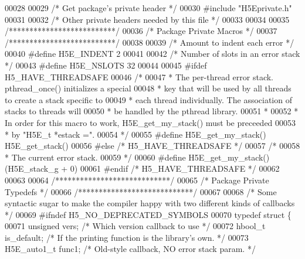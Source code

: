 \begin{DoxyCode}
00028 
00029 \textcolor{comment}{/* Get package's private header */}
00030 \textcolor{preprocessor}{#include "H5Eprivate.h"}
00031 
00032 \textcolor{comment}{/* Other private headers needed by this file */}
00033 
00034 
00035 \textcolor{comment}{/**************************/}
00036 \textcolor{comment}{/* Package Private Macros */}
00037 \textcolor{comment}{/**************************/}
00038 
00039 \textcolor{comment}{/* Amount to indent each error */}
00040 \textcolor{preprocessor}{#define H5E\_INDENT              2}
00041 
00042 \textcolor{comment}{/* Number of slots in an error stack */}
00043 \textcolor{preprocessor}{#define H5E\_NSLOTS          32}
00044 
00045 \textcolor{preprocessor}{#ifdef H5\_HAVE\_THREADSAFE}
00046 \textcolor{comment}{/*}
00047 \textcolor{comment}{ * The per-thread error stack. pthread\_once() initializes a special}
00048 \textcolor{comment}{ * key that will be used by all threads to create a stack specific to}
00049 \textcolor{comment}{ * each thread individually. The association of stacks to threads will}
00050 \textcolor{comment}{ * be handled by the pthread library.}
00051 \textcolor{comment}{ *}
00052 \textcolor{comment}{ * In order for this macro to work, H5E\_get\_my\_stack() must be preceeded}
00053 \textcolor{comment}{ * by "H5E\_t *estack =".}
00054 \textcolor{comment}{ */}
00055 \textcolor{preprocessor}{#define H5E\_get\_my\_stack()  H5E\_get\_stack()}
00056 \textcolor{preprocessor}{#else }\textcolor{comment}{/* H5\_HAVE\_THREADSAFE */}\textcolor{preprocessor}{}
00057 \textcolor{comment}{/*}
00058 \textcolor{comment}{ * The current error stack.}
00059 \textcolor{comment}{ */}
00060 \textcolor{preprocessor}{#define H5E\_get\_my\_stack() (H5E\_stack\_g + 0)}
00061 \textcolor{preprocessor}{#endif }\textcolor{comment}{/* H5\_HAVE\_THREADSAFE */}\textcolor{preprocessor}{}
00062 
00063 
00064 \textcolor{comment}{/****************************/}
00065 \textcolor{comment}{/* Package Private Typedefs */}
00066 \textcolor{comment}{/****************************/}
00067 
00068 \textcolor{comment}{/* Some syntactic sugar to make the compiler happy with two different kinds of callbacks */}
00069 \textcolor{preprocessor}{#ifndef H5\_NO\_DEPRECATED\_SYMBOLS}
00070 \textcolor{keyword}{typedef} \textcolor{keyword}{struct }\{
00071     \textcolor{keywordtype}{unsigned}    vers;       \textcolor{comment}{/* Which version callback to use */}
00072     hbool\_t     is\_default; \textcolor{comment}{/* If the printing function is the library's own. */}
00073     H5E\_auto1\_t func1;      \textcolor{comment}{/* Old-style callback, NO error stack param. */}

\end{DoxyCode}
